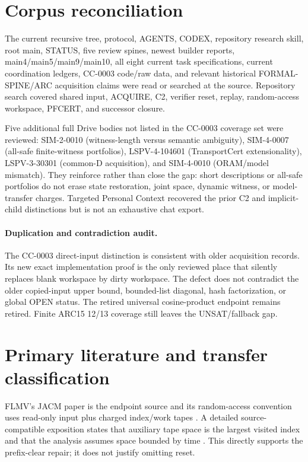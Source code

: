 \documentclass[11pt]{article}
\begin{document}
\section{Corpus reconciliation}
The current recursive tree, protocol, AGENTS, CODEX, repository research
skill, root main, STATUS, five review spines, newest builder reports,
main4/main5/main9/main10, all eight current task specifications, current
coordination ledgers, CC-0003 code/raw data, and relevant historical
FORMAL-SPINE/ARC acquisition claims were read or searched at the source.
Repository search covered shared input, ACQUIRE, C2, verifier reset, replay,
random-access workspace, PFCERT, and successor closure.

Five additional full Drive bodies not listed in the CC-0003 coverage set
were reviewed: SIM-2-0010 (witness-length versus semantic ambiguity),
SIM-4-0007 (all-safe finite-witness portfolios), LSPV-4-104601
(TransportCert extensionality), LSPV-3-30301 (common-D acquisition), and
SIM-4-0010 (ORAM/model mismatch).  They reinforce rather than close the gap:
short descriptions or all-safe portfolios do not erase state restoration,
joint space, dynamic witness, or model-transfer charges.  Targeted Personal
Context recovered the prior C2 and implicit-child distinctions but is not an
exhaustive chat export.

\paragraph{Duplication and contradiction audit.}
The CC-0003 direct-input distinction is consistent with older acquisition
records.  Its new exact implementation proof is the only reviewed place that
silently replaces blank workspace by dirty workspace.  The defect does not
contradict the older copied-input upper bound, bounded-list diagonal, hash
factorization, or global OPEN status.  The retired universal cosine-product
endpoint remains retired.  Finite ARC15 12/13 coverage still leaves the
UNSAT/fallback gap.

\section{Primary literature and transfer classification}
FLMV's JACM paper is the endpoint source and its random-access convention
uses read-only input plus charged index/work tapes \cite{flmv}.  A detailed
source-compatible exposition states that auxiliary tape space is the largest
visited index and that the analysis assumes space bounded by time
\cite[Section 2.1]{diehl}.  This directly supports the prefix-clear repair;
it does not justify omitting reset.
\end{document}
